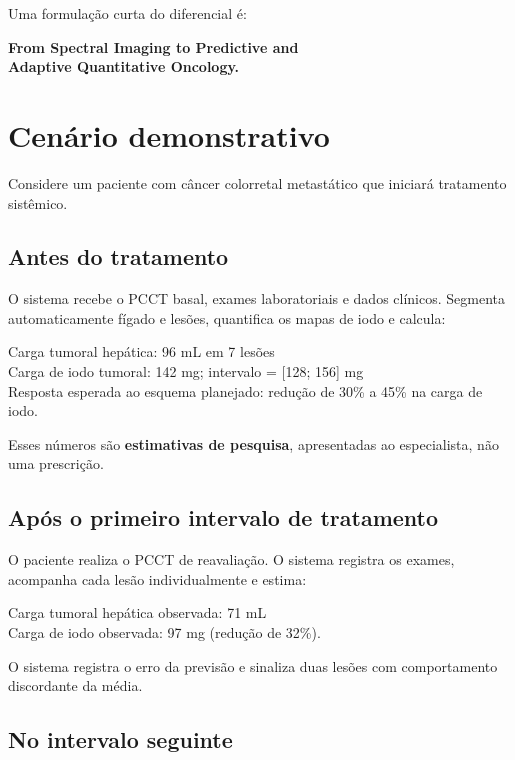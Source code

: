 \documentclass[11pt,a4paper]{article}
\begin{document}
Uma formulação curta do diferencial é:

\begin{center}
{\large\bfseries From Spectral Imaging to Predictive and\\Adaptive Quantitative Oncology.}
\end{center}

\section{Cenário demonstrativo}

Considere um paciente com câncer colorretal metastático que iniciará tratamento sistêmico.

\subsection*{Antes do tratamento}

O sistema recebe o PCCT basal, exames laboratoriais e dados clínicos. Segmenta automaticamente fígado e lesões, quantifica os mapas de iodo e calcula:
\begin{center}
Carga tumoral hepática: 96 mL em 7 lesões\\
Carga de iodo tumoral: 142 mg; intervalo = [128; 156] mg\\
Resposta esperada ao esquema planejado: redução de 30\% a 45\% na carga de iodo.
\end{center}
Esses números são \textbf{estimativas de pesquisa}, apresentadas ao especialista, não uma prescrição.

\subsection*{Após o primeiro intervalo de tratamento}

O paciente realiza o PCCT de reavaliação. O sistema registra os exames, acompanha cada lesão individualmente e estima:
\begin{center}
Carga tumoral hepática observada: 71 mL\\
Carga de iodo observada: 97 mg (redução de 32\%).
\end{center}
O sistema registra o erro da previsão e sinaliza duas lesões com comportamento discordante da média.

\subsection*{No intervalo seguinte}
\end{document}
